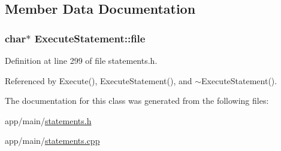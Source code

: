 \subsection{Member Data Documentation}
\subsubsection[{\texorpdfstring{file}{file}}]{\setlength{\rightskip}{0pt plus 5cm}char$\ast$ Execute\+Statement\+::file\hspace{0.3cm}{\ttfamily [private]}}\hypertarget{classExecuteStatement_a9565fccd4169cfcbeb8811085bbdeca5}{}\label{classExecuteStatement_a9565fccd4169cfcbeb8811085bbdeca5}


Definition at line 299 of file statements.\+h.



Referenced by Execute(), Execute\+Statement(), and $\sim$\+Execute\+Statement().



The documentation for this class was generated from the following files\+:\begin{DoxyCompactItemize}
\item 
app/main/\hyperlink{statements_8h}{statements.\+h}\item 
app/main/\hyperlink{statements_8cpp}{statements.\+cpp}\end{DoxyCompactItemize}

